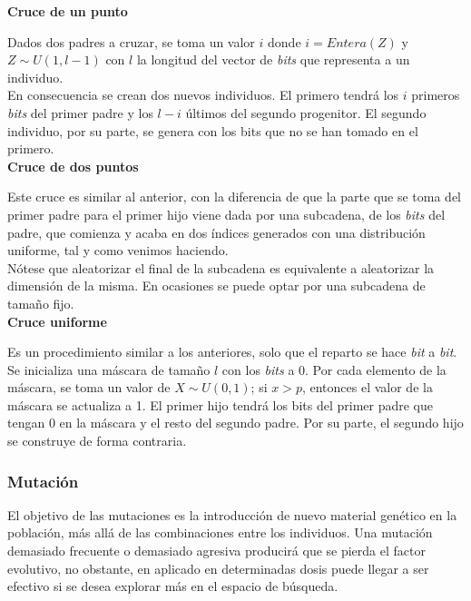 			\textbf{Cruce de un punto}
			
			Dados dos padres a cruzar, se toma un valor $i$ donde $i=Entera(Z)$ y $Z\sim U(1,l-1)$ con $l$ la longitud del vector de \textit{bits} que representa a un individuo. \\
			
			En consecuencia se crean dos nuevos individuos. El primero tendr\'a los $i$ primeros \textit{bits} del primer padre y los $l-i$ \'ultimos del segundo progenitor. El segundo individuo, por su parte, se genera con los bits que no se han tomado en el primero.\\
			
			\textbf{Cruce de dos puntos}

			Este cruce es similar al anterior, con la diferencia de que la parte que se toma del primer padre para el primer hijo viene dada por una subcadena, de los \textit{bits} del padre, que comienza y acaba en dos \'indices generados con una distribuci\'on uniforme, tal y como venimos haciendo.\\
			
			N\'otese que aleatorizar el final de la subcadena es equivalente a aleatorizar la dimensi\'on de la misma. En ocasiones se puede optar por una subcadena de tama\~no fijo. \\
			
			\textbf{Cruce uniforme}
			
			Es un procedimiento similar a los anteriores, solo que el reparto se hace \textit{bit} a \textit{bit}. Se inicializa una m\'ascara de tama\~no $l$ con los \textit{bits} a 0. Por cada elemento de la m\'ascara, se toma un valor de $X \sim U(0,1)$; si $x > p$, entonces el valor de la m\'ascara se actualiza a 1. El primer hijo tendr\'a los bits del primer padre que tengan 0 en la m\'ascara y el resto del segundo padre. Por su parte, el segundo hijo se construye de forma contraria. \\
			
			
			\subsubsection{Mutaci\'on}

			El objetivo de las mutaciones es la introducci\'on de nuevo material gen\'etico en la poblaci\'on, m\'as all\'a de las combinaciones entre los individuos. Una mutaci\'on demasiado frecuente o demasiado agresiva producir\'a que se pierda el factor evolutivo, no obstante, en aplicado en determinadas dosis puede llegar a ser efectivo si se desea explorar m\'as en el espacio de b\'usqueda.\\
			

